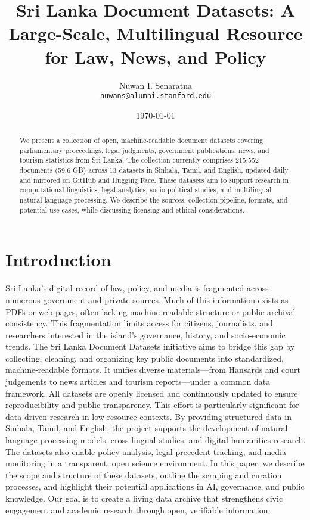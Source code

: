 \documentclass{article}%
\title{Sri Lanka Document Datasets: A Large{-}Scale, Multilingual Resource for Law, News, and Policy}%
\author{Nuwan I. Senaratna\\\vspace{0.25em}\texttt{\href{mailto:nuwans@alumni.stanford.edu}{nuwans@alumni.stanford.edu}}}%
\date{\today}%
\begin{document}
%
\normalsize%
\maketitle%
\begin{abstract}%
We present a collection of open, machine{-}readable document datasets covering parliamentary proceedings, legal judgments, government publications, news, and tourism statistics from Sri Lanka.  The collection currently comprises 215,552 documents (59.6 GB) across 13 datasets in Sinhala, Tamil, and English, updated daily and mirrored on GitHub and Hugging Face.  These datasets aim to support research in computational linguistics, legal analytics, socio{-}political studies, and multilingual natural language processing.  We describe the sources, collection pipeline, formats, and potential use cases, while discussing licensing and ethical considerations.%
\newline%
\newline%
\end{abstract}%
\section{Introduction}%
\label{sec:Introduction}%
Sri Lanka’s digital record of law, policy, and media is fragmented across numerous government and private sources. Much of this information exists as PDFs or web pages, often lacking machine{-}readable structure or public archival consistency. This fragmentation limits access for citizens, journalists, and researchers interested in the island’s governance, history, and socio{-}economic trends.%
\newline%
\newline%
The Sri Lanka Document Datasets initiative aims to bridge this gap by collecting, cleaning, and organizing key public documents into standardized, machine{-}readable formats. It unifies diverse materials—from Hansards and court judgements to news articles and tourism reports—under a common data framework. All datasets are openly licensed and continuously updated to ensure reproducibility and public transparency.%
\newline%
\newline%
This effort is particularly significant for data{-}driven research in low{-}resource contexts. By providing structured data in Sinhala, Tamil, and English, the project supports the development of natural language processing models, cross{-}lingual studies, and digital humanities research. The datasets also enable policy analysis, legal precedent tracking, and media monitoring in a transparent, open science environment.%
\newline%
\newline%
In this paper, we describe the scope and structure of these datasets, outline the scraping and curation processes, and highlight their potential applications in AI, governance, and public knowledge. Our goal is to create a living data archive that strengthens civic engagement and academic research through open, verifiable information.%
\newline%
\newline
\end{document}
